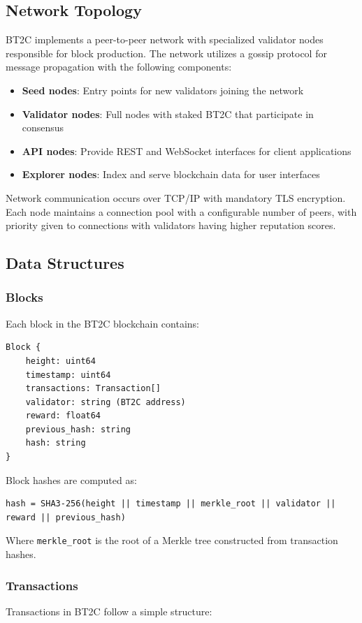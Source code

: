 \documentclass[10pt,a4paper]{article}
\begin{document}
\subsection{Network Topology}
BT2C implements a peer-to-peer network with specialized validator nodes responsible for block production. The network utilizes a gossip protocol for message propagation with the following components:

\begin{itemize}
\item \textbf{Seed nodes}: Entry points for new validators joining the network
\item \textbf{Validator nodes}: Full nodes with staked BT2C that participate in consensus
\item \textbf{API nodes}: Provide REST and WebSocket interfaces for client applications
\item \textbf{Explorer nodes}: Index and serve blockchain data for user interfaces
\end{itemize}

Network communication occurs over TCP/IP with mandatory TLS encryption. Each node maintains a connection pool with a configurable number of peers, with priority given to connections with validators having higher reputation scores.

\subsection{Data Structures}

\subsubsection{Blocks}
Each block in the BT2C blockchain contains:

\begin{verbatim}
Block {
    height: uint64
    timestamp: uint64
    transactions: Transaction[]
    validator: string (BT2C address)
    reward: float64
    previous_hash: string
    hash: string
}
\end{verbatim}

Block hashes are computed as:
\begin{verbatim}
hash = SHA3-256(height || timestamp || merkle_root || validator || reward || previous_hash)
\end{verbatim}

Where \texttt{merkle\_root} is the root of a Merkle tree constructed from transaction hashes.

\subsubsection{Transactions}
Transactions in BT2C follow a simple structure:
\end{document}
